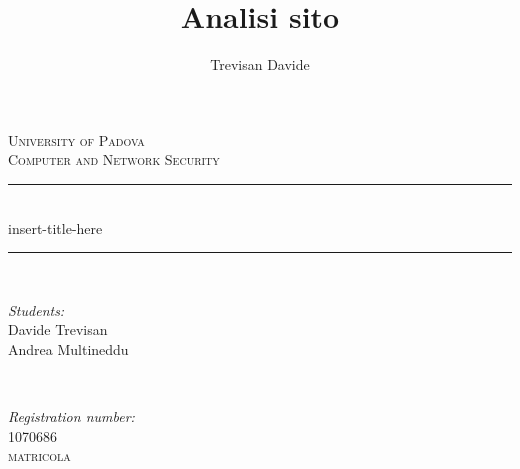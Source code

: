 \documentclass[12pt]{article}
\title{Analisi sito}
\date{}
\author{Trevisan Davide}
\begin{document}
		
		
		
		\begin{titlepage}
			
			\newcommand{\HRule}{\rule{\linewidth}{0.5mm}} %
			
			\center %
			
			
			\textsc{\LARGE University of Padova}\\[1.5cm] %
			\textsc{\Large Computer and Network Security}\\[0.5cm] %
			
			
			\HRule \\[0.4cm]
			{ \huge insert-title-here}\\[0.3cm]
			\HRule \\[1.5cm]
			
			
			\begin{minipage}{0.4\textwidth}
				\begin{flushleft} \large
					\emph{Students:}\\
					Davide Trevisan\\ %
					Andrea Multineddu\\
				\end{flushleft}
			\end{minipage}
			~
			\begin{minipage}{0.4\textwidth}
				\begin{flushright}\large
					\emph{Registration number:} \\
					\textsc{1070686}\\ %
					\textsc{matricola}\\
				\end{flushright}
			\end{minipage}\\[1cm]
			

\end{titlepage}
\end{document}
